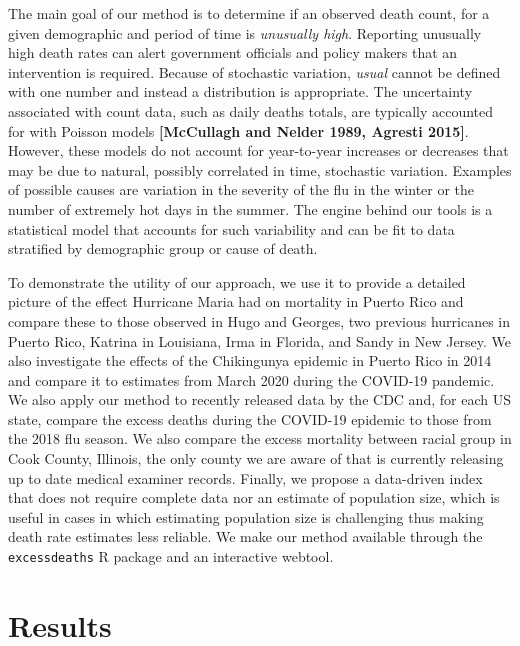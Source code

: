 \documentclass[11pt]{article}
\begin{document}
The main goal of our method is to determine if an observed death count, for a given demographic and period of time is \textit{unusually high}. Reporting unusually high death rates can alert government officials and policy makers that an intervention is required. Because of stochastic variation, \textit{usual} cannot be defined with one number and instead a distribution is appropriate. The uncertainty associated with count data, such as daily deaths totals, are typically accounted for with Poisson models \textbf{[McCullagh and Nelder 1989, Agresti 2015]}. However, these models do not account for year-to-year increases or decreases that may be due to natural, possibly correlated in time, stochastic variation. Examples of possible causes are variation in the severity of the flu in the winter or the number of extremely hot days in the summer. The engine behind our tools is a statistical model that accounts for such variability and can be fit to data stratified by demographic group or cause of death. 

To demonstrate the utility of our approach, we use it to provide a detailed picture of the effect Hurricane Maria had on mortality in Puerto Rico and compare these to those observed in Hugo and Georges, two previous hurricanes in Puerto Rico, Katrina in Louisiana, Irma in Florida, and Sandy in New Jersey. We also investigate the effects of the Chikingunya epidemic in Puerto Rico in 2014 and compare it to estimates from March 2020 during the COVID-19 pandemic. We also apply our method to recently released data by the CDC and, for each US state, compare the excess deaths during the COVID-19 epidemic to those from the 2018 flu season. We also compare the excess mortality between racial group in Cook County, Illinois, the only county we are aware of that is currently releasing up to date medical examiner records. Finally, we propose a data-driven index that does not require complete data nor an estimate of population size, which is useful in cases in which estimating population size is challenging thus making death rate estimates less reliable. We make our method available through the \verb+excessdeaths+ R package and an interactive webtool. \\

\section{Results}
\label{sec:results}
\end{document}
